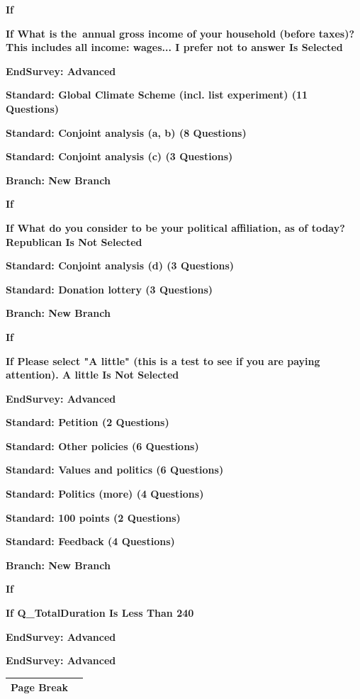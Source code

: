 \documentclass{article} %
\begin{document}
\textbf{If}

\textbf{If What is the~annual gross income of your household (before taxes)? This includes all income: wages... I prefer not to answer Is Selected}

\noindent \textbf{EndSurvey: Advanced}

\noindent \textbf{Standard: Global Climate Scheme (incl. list experiment) (11 Questions)}

\noindent \textbf{Standard: Conjoint analysis (a, b) (8 Questions)}

\noindent \textbf{Standard: Conjoint analysis (c) (3 Questions)}

\noindent \textbf{Branch: New Branch}

\textbf{If}

\textbf{If What do you consider to be your political affiliation, as of today? Republican Is Not Selected}

\noindent \textbf{Standard: Conjoint analysis (d) (3 Questions)}

\noindent \textbf{Standard: Donation lottery (3 Questions)}

\noindent \textbf{Branch: New Branch}

\textbf{If}

\textbf{If Please select "A little" (this is a test to see if you are paying attention). A little Is Not Selected}

\noindent \textbf{EndSurvey: Advanced}

\noindent \textbf{Standard: Petition (2 Questions)}

\noindent \textbf{Standard: Other policies (6 Questions)}

\noindent \textbf{Standard: Values and politics (6 Questions)}

\noindent \textbf{Standard: Politics (more) (4 Questions)}

\noindent \textbf{Standard: 100 points (2 Questions)}

\noindent \textbf{Standard: Feedback (4 Questions)}

\noindent \textbf{Branch: New Branch}

\textbf{If}

\textbf{If  Q\_TotalDuration Is Less Than  240}

\noindent \textbf{EndSurvey: Advanced}

\noindent \textbf{EndSurvey: Advanced}

\begin{tabular}{|p{0.6in}|p{3.8in}|} \hline 
Page Break &  \\ \hline 
\end{tabular}
\end{document}
